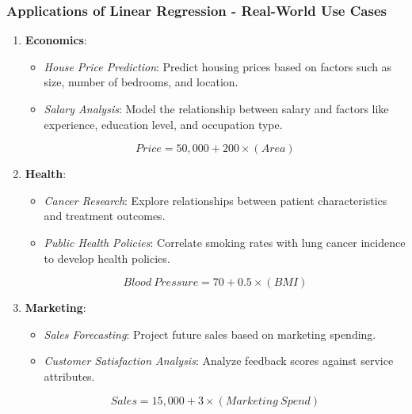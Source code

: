 \documentclass[aspectratio=169]{beamer}
\begin{document}
\begin{frame}[fragile]
    \frametitle{Applications of Linear Regression - Real-World Use Cases}
    \begin{enumerate}
        \item \textbf{Economics}:
            \begin{itemize}
                \item \textit{House Price Prediction}: Predict housing prices based on factors such as size, number of bedrooms, and location.
                \item \textit{Salary Analysis}: Model the relationship between salary and factors like experience, education level, and occupation type.
            \end{itemize}
            \begin{equation}
                Price = 50,000 + 200 \times (Area)
            \end{equation}

        \item \textbf{Health}:
            \begin{itemize}
                \item \textit{Cancer Research}: Explore relationships between patient characteristics and treatment outcomes.
                \item \textit{Public Health Policies}: Correlate smoking rates with lung cancer incidence to develop health policies.
            \end{itemize}
            \begin{equation}
                Blood\ Pressure = 70 + 0.5 \times (BMI)
            \end{equation}

        \item \textbf{Marketing}:
            \begin{itemize}
                \item \textit{Sales Forecasting}: Project future sales based on marketing spending.
                \item \textit{Customer Satisfaction Analysis}: Analyze feedback scores against service attributes.
            \end{itemize}
            \begin{equation}
                Sales = 15,000 + 3 \times (Marketing\ Spend)
            \end{equation}
    \end{enumerate}
\end{frame}
\end{document}
